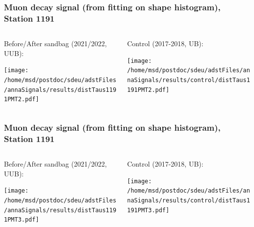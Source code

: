 \documentclass[aspectratio=169]{beamer}
\begin{document}
\begin{frame}
  \frametitle{Muon decay signal (from fitting on shape histogram), Station 1191}
  
  \begin{columns}[T,c]
    \begin{column}{.5\textwidth}
      Before/After sandbag (2021/2022, UUB):
      \vspace{.3cm}

      \texttt{[image: /home/msd/postdoc/sdeu/adstFiles/annaSignals/results/distTaus1191PMT2.pdf]}
    \end{column}
    \begin{column}{.5\textwidth}
      Control (2017-2018, UB):
      \vspace{0.3cm}

      \texttt{[image: /home/msd/postdoc/sdeu/adstFiles/annaSignals/results/control/distTaus1191PMT2.pdf]}
    \end{column}    
\end{columns}
\end{frame}

\begin{frame}
  \frametitle{Muon decay signal (from fitting on shape histogram), Station 1191}
  
  \begin{columns}[T,c]
    \begin{column}{.5\textwidth}
      Before/After sandbag (2021/2022, UUB):
      \vspace{.3cm}

      \texttt{[image: /home/msd/postdoc/sdeu/adstFiles/annaSignals/results/distTaus1191PMT3.pdf]}
    \end{column}
    \begin{column}{.5\textwidth}
      Control (2017-2018, UB):
      \vspace{0.3cm}

      \texttt{[image: /home/msd/postdoc/sdeu/adstFiles/annaSignals/results/control/distTaus1191PMT3.pdf]}
    \end{column}    
\end{columns}
\end{frame}

\end{document}
